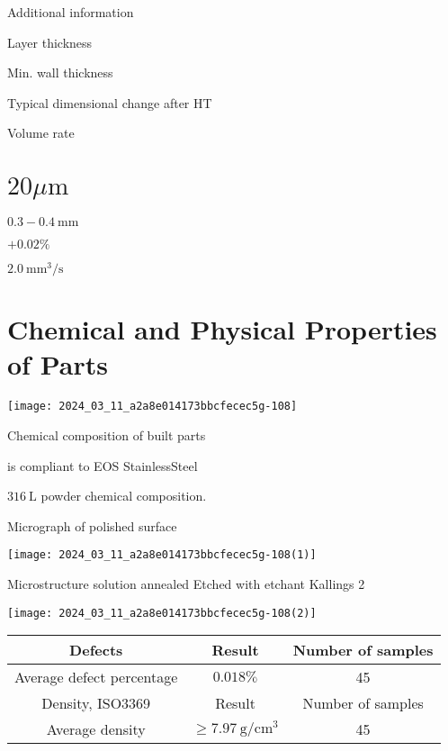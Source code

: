 \documentclass[10pt]{article}
\begin{document}
Additional information

Layer thickness

Min. wall thickness

Typical dimensional change after HT

Volume rate

\section*{$20 \mu \mathrm{m}$}
$0.3-0.4 \mathrm{~mm}$

$+0.02 \%$

$2.0 \mathrm{~mm}^{3} / \mathrm{s}$

\section*{Chemical and Physical Properties of Parts}
\begin{center}
\texttt{[image: 2024\_03\_11\_a2a8e014173bbcfecec5g-108]}
\end{center}

Chemical composition of built parts

is compliant to EOS StainlessSteel

$316 \mathrm{~L}$ powder chemical composition.

Micrograph of polished surface

\begin{center}
\texttt{[image: 2024\_03\_11\_a2a8e014173bbcfecec5g-108(1)]}
\end{center}

Microstructure solution annealed Etched with etchant Kallings 2

\begin{center}
\texttt{[image: 2024\_03\_11\_a2a8e014173bbcfecec5g-108(2)]}
\end{center}

\begin{center}
\begin{tabular}{|c|c|c|}
\hline
Defects & Result & Number of samples \\
\hline
Average defect percentage & $0.018 \%$ & 45 \\
\hline
Density, ISO3369 & Result & Number of samples \\
\hline
Average density & $\geq 7.97 \mathrm{~g} / \mathrm{cm}^{3}$ & 45 \\
\hline
\end{tabular}
\end{center}
\end{document}

